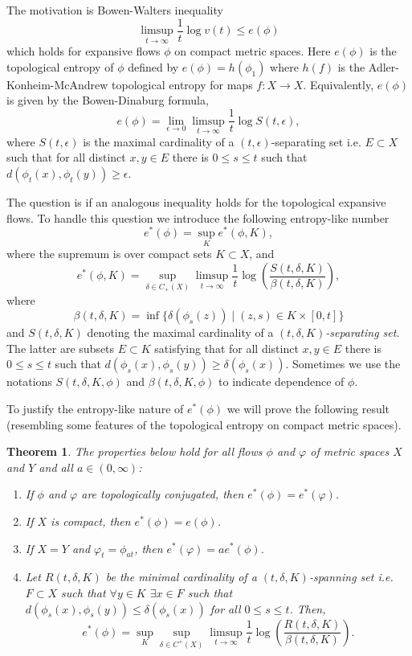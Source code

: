 \documentclass[11pt,letterpaper]{amsart}
\newtheorem{thm}{Theorem}%
\begin{document}
The motivation is Bowen-Walters inequality \cite{bw}
$$
\limsup_{t\to\infty}\frac{1}t\log v(t)\leq e(\phi)
$$
which holds for expansive flows $\phi$ on compact metric spaces.
Here $e(\phi)$ is the topological entropy of $\phi$ defined by $e(\phi)=h(\phi_1)$ where $h(f)$ is the Adler-Konheim-McAndrew topological entropy for maps $f:X\to X$.
Equivalently, $e(\phi)$ is given by the Bowen-Dinaburg formula,
$$
e(\phi)=\lim_{\epsilon\to0}\limsup_{t\to\infty}\frac{1}t\log S(t,\epsilon),
$$
where $S(t,\epsilon)$ is the maximal cardinality of a $(t,\epsilon)$-separating set i.e. $E\subset X$ such that for all distinct $x,y\in E$ there is $0\leq s\leq t$ such that $d(\phi_t(x),\phi_t(y))\geq \epsilon$.

The question is if an analogous inequality holds for the topological expansive flows.
To handle this question we introduce the following entropy-like number
$$
e^*(\phi) = \sup_K e^*(\phi, K),
$$
where the supremum is over compact sets $K \subset X$, and
$$
e^*(\phi, K) = \sup_{\delta \in C_+(X)} \limsup_{t \to \infty} \frac{1}{t} \log \left(\frac{S(t, \delta, K)}{\beta(t,\delta,K)}\right),
$$
where
$$
\beta(t,\delta,K)=\inf\{\delta(\phi_s(z))\mid (z,s)\in K\times [0,t]\}
$$
and $S(t, \delta, K)$ denoting the maximal cardinality of a {\em $(t, \delta, K)$-separating set}. The latter are subsets $E\subset K$ satisfying that for all distinct $x,y\in E$ there is $0\leq s\leq t$ such that
$d(\phi_s(x),\phi_s(y))\geq \delta(\phi_s(x))$.
Sometimes we use the notations $S(t, \delta, K,\phi)$ and $\beta(t, \delta, K,\phi)$
to indicate dependence of $\phi$.

To justify the entropy-like nature of $e^*(\phi)$ we will prove the following result (resembling some features of the topological entropy on compact metric spaces).

\begin{thm}
\label{sa}
The properties below hold for all flows $\phi$ and $\varphi$ of metric spaces $X$ and $Y$ and all $a\in (0,\infty)$:
\begin{enumerate}
\item
If $\phi$ and $\varphi$ are topologically conjugated, then $e^*(\phi)=e^*(\varphi)$.
\item
If $X$ is compact, then $e^*(\phi)=e(\phi)$.
\item
If $X=Y$ and $\varphi_t=\phi_{at}$, then $e^*(\varphi)=ae^*(\phi)$.
\item
Let $R(t,\delta,K)$ be the minimal cardinality of a {\em $(t,\delta,K)$-spanning set} i.e.
$F\subset X$ such that $\forall y\in K$ $\exists x\in F$ such that $d(\phi_s(x),\phi_s(y))\leq \delta(\phi_s(x))$ for all $0\leq s\leq t$. Then,
$$
e^*(\phi)=\sup_K\sup_{\delta\in C^+(X)}\limsup_{t\to\infty}\frac{1}t\log \left(\frac{R(t,\delta,K)}{\beta(t,\delta,K)}\right).
$$
\end{enumerate}
\end{thm}
\end{document}
